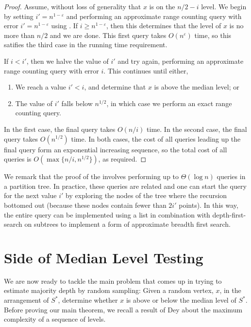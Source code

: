 \documentclass{patmorin}
\newcommand{\eps}{\varepsilon}
\begin{document}
\begin{proof}
  Assume, without loss of generality that $x$ is on the $n/2-i$
  level.  We begin by setting $i'= n^{1-\eps}$ and performing
  an approximate range counting query with error $i'=n^{1-\eps}$
  using .  If $i \ge n^{1-\eps}$, then this
  determines that the level of $x$ is no more than $n/2$ and we are done.
  This first query takes $O(n^{\eps})$ time, so this satifies the
  third case in the running time requirement.

  If $i < i'$, then we halve the value of $i'$ and try again, performing
  an approximate range counting query with error $i$.  This continues
  until either,
  \begin{enumerate}
    \item We reach a value $i' < i$, and determine that $x$ is above the
      median level; or
    \item The value of $i'$ falls below $n^{1/2}$, in which case we perform
      an exact range counting query.
  \end{enumerate}
  In the first case, the final query takes $O(n/i)$ time. In the second
  case, the final query takes $O(n^{1/2})$ time.  In both cases, the cost
  of all queries leading up the final query form an exponential increasing
  sequence, so the total cost of all queries is $O(\max\{n/i,n^{1/2}\})$,
  as required.
\end{proof}

We remark that the proof of the  involves performing
up to $\Theta(\log n)$ queries in a partition tree.  In practice, these
queries are related and one can start the query for the next value $i'$
by exploring the nodes of the tree where the recursion bottomed out
(because these nodes contain fewer than $2i'$ points).  In this way,
the entire query can be implemented using a list in combination with
depth-first-search on subtrees to implement a form of approximate breadth
first search.

\section{Side of Median Level Testing}

We are now ready to tackle the main problem that comes up in trying to
estimate majority depth by random sampling:  Given a random vertex, $x$,
in the arrangement of $S^*$, determine whether $x$ is above or below
the median level of $S^*$.  Before proving our main theorem, we recall
a result of Dey \cite[Theorem~4.2]{d98} about the maximum complexity of
a sequence of levels.
\end{document}
